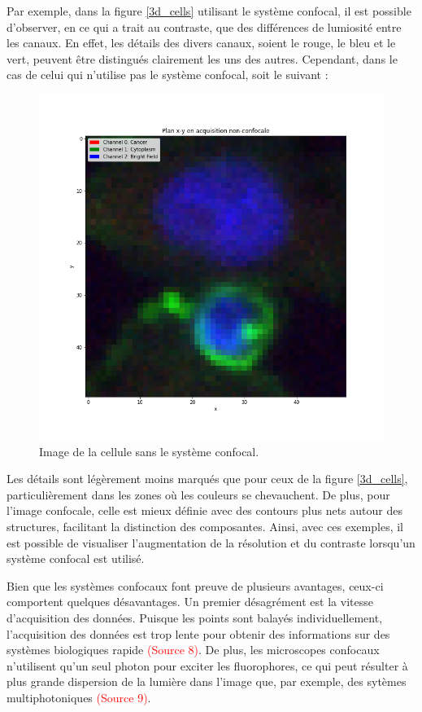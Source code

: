 \documentclass[11pt,letterpaper]{article}
\begin{document}
Par exemple, dans la figure \ref{3d_cells} utilisant le système confocal, il est possible d'observer, en ce qui a trait au contraste, que des différences de lumiosité entre les canaux. En effet, les détails des divers canaux, soient le rouge, le bleu et le vert, peuvent être distingués clairement les uns des autres. Cependant, dans le cas de celui qui n'utilise pas le système confocal, soit le suivant :
\begin{figure}[H]
  \centering
  \includegraphics[scale=0.2]{xy_plane_non_confocal.png}
  \caption{Image de la cellule sans le système confocal.}
  \label{non-confocal}
\end{figure}
Les détails sont légèrement moins marqués que pour ceux de la figure \ref{3d_cells}, particulièrement dans les zones où les couleurs se chevauchent. De plus, pour l'image confocale, celle est mieux définie avec des contours plus nets autour des structures, facilitant la distinction des composantes. Ainsi, avec ces exemples, il est possible de visualiser l'augmentation de la résolution et du contraste lorsqu'un système confocal est utilisé.

Bien que les systèmes confocaux font preuve de plusieurs avantages, ceux-ci comportent quelques désavantages. Un premier désagrément est la vitesse d'acquisition des données. Puisque les points sont balayés individuellement, l'acquisition des données est trop lente pour obtenir des informations sur des systèmes biologiques rapide \textcolor{red}{(Source 8)}. De plus, les microscopes confocaux n'utilisent qu'un seul photon pour exciter les fluorophores, ce qui peut résulter à plus grande dispersion de la lumière dans l'image que, par exemple, des sytèmes multiphotoniques \textcolor{red}{(Source 9)}.
\end{document}
